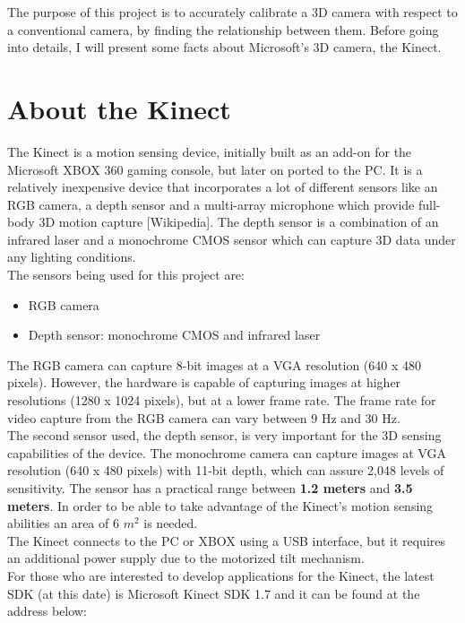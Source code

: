 The purpose of this project is to accurately calibrate a 3D camera with respect to a conventional camera, by finding the relationship between them. Before going into details, I will present some facts about Microsoft's 3D camera, the Kinect. \\

\section{About the Kinect}

The Kinect is a motion sensing device, initially built as an add-on for the Microsoft XBOX 360 gaming console, but later on ported to the PC. It is a relatively inexpensive device that incorporates a lot of different sensors like an RGB camera, a depth sensor and a multi-array microphone which provide full-body 3D motion capture [Wikipedia]. The depth sensor is a combination of an infrared laser and a monochrome CMOS sensor which can capture 3D data under any lighting conditions. \\
The sensors being used for this project are:

\begin{itemize}
	\item RGB camera
	\item Depth sensor: monochrome CMOS and infrared laser
\end{itemize}

\noindent
The RGB camera can capture 8-bit images at a VGA resolution (640 x 480 pixels). However, the hardware is capable of capturing images at higher resolutions (1280 x 1024 pixels), but at a lower frame rate. The frame rate for video capture from the RGB camera can vary between 9 Hz and 30 Hz.
\\
The second sensor used, the depth sensor, is very important for the 3D sensing capabilities of the device. The monochrome camera can capture images at VGA resolution (640 x 480 pixels) with 11-bit depth, which can assure 2,048 levels of sensitivity. The sensor has a practical range between {\bf 1.2 meters} and {\bf 3.5 meters}. In order to be able to take advantage of the Kinect's motion sensing abilities an area of 6 $m^2$ is needed. 
\\
The Kinect connects to the PC or XBOX using a USB interface, but it requires an additional power supply due to the motorized tilt mechanism. 
\\
\noindent
For those who are interested to develop applications for the Kinect, the latest SDK (at this date) is Microsoft Kinect SDK 1.7 and it can be found at the address below:

